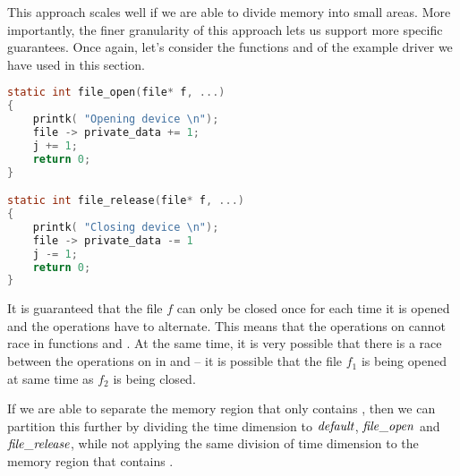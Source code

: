 \documentclass[..thesis.tex]{subfiles}
\begin{document}
This approach scales well if we are able to divide memory into small areas.
%
%
%
More importantly, the finer granularity of this approach lets us support more specific guarantees.
%
Once again, let's consider the functions  and  of the example driver we have used in this section.

\begin{lstlisting}[language=c,style=def]
static int file_open(file* f, ...)
{
    printk( "Opening device \n");
    file -> private_data += 1;
    j += 1;
    return 0;
}

static int file_release(file* f, ...)
{
    printk( "Closing device \n");
    file -> private_data -= 1
    j -= 1;
    return 0;
}
\end{lstlisting}

It is guaranteed that the file $f$ can only be closed once for each time it is opened and the operations have to alternate. This means that the operations on 
cannot race in functions  and . At the same time, it is very possible that there is a race between the operations on  in  and 
-- it is possible that the file $f_1$ is being opened at same time as $f_2$ is being closed. 

If we are able to separate the memory region that only contains , then we can partition this further by dividing the time dimension to $\mathit{default}$, $\mathit{file\_open}$ and $\mathit{file\_release}$,
while not applying the same division of time dimension to the memory region that contains . 
\end{document}
